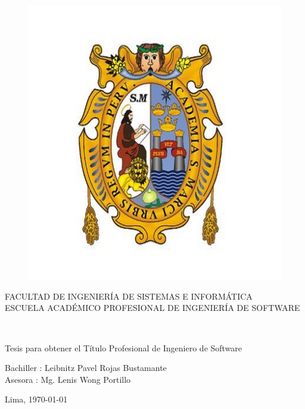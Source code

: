 \begin{titlepage}
\begin{center}
    \vspace*{-1in}
    \begin{figure}[h]
        \begin{center}
            \includegraphics[scale=0.5]{./figuras/escudo_unmsm.jpg}
        \end{center}
    \end{figure}
    FACULTAD DE INGENIERÍA DE SISTEMAS E INFORMÁTICA\\
    \vspace*{0.5cm}
    ESCUELA ACADÉMICO PROFESIONAL DE INGENIERÍA DE SOFTWARE \\
    \vspace*{3cm}
    \begin{Large}
    \textbf{\miTesisTitulo} \\
    \end{Large}
    \vspace*{2cm}
    \begin{large}
        Tesis para obtener el Título Profesional de Ingeniero de Software\\
    \end{large}
    \vspace*{2cm}
    \begin{flushright}
    	Bachiller : Leibnitz Pavel Rojas Bustamante\\
    	Asesora : Mg. Lenis Wong Portillo
    \end{flushright}
    \vspace*{2cm}
    \begin{flushright}
    Lima, \today
    \end{flushright}
\end{center}
\end{titlepage}
